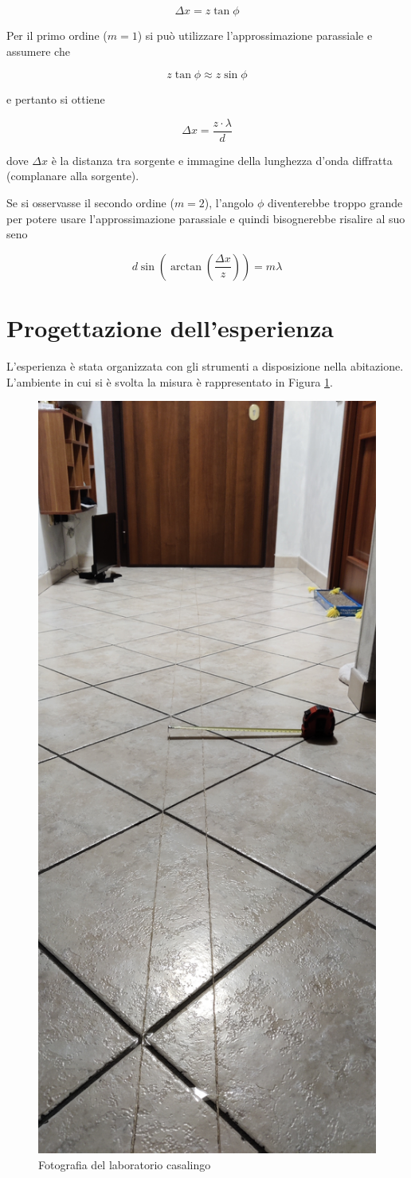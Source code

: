 \documentclass{article}
\begin{document}
\[\Delta x = z\tan\phi\]

Per il primo ordine ($m=1$) si può utilizzare l'approssimazione parassiale e assumere che 

\[z\tan\phi \approx z\sin\phi\]

e pertanto si ottiene 

\begin{equation}
    \Delta x = \frac{z \cdot \lambda}{d}
    \label{first_order_equation}
\end{equation}

dove $\Delta x$ è la distanza tra sorgente e immagine della lunghezza d'onda diffratta (complanare alla sorgente).

Se si osservasse il secondo ordine ($m=2$), l'angolo $\phi$ diventerebbe troppo grande per potere usare l'approssimazione parassiale e quindi bisognerebbe risalire al suo seno

\begin{equation}
    d\sin\left(\arctan\left(\frac{\Delta x}{z}\right)\right) = m\lambda
    \label{second_order_equation}
\end{equation}

\section{Progettazione dell'esperienza} \label{Progettazione}

L'esperienza è stata organizzata con gli strumenti a disposizione nella abitazione. L'ambiente in cui si è svolta la misura è rappresentato in Figura \ref{ambiente}.

\begin{figure}[h!]
    \centering
    \includegraphics[width=0.2\linewidth]{Fili_Paralleli.jpg}
    \caption{Fotografia del laboratorio casalingo}
    \label{ambiente}
\end{figure}
\end{document}
